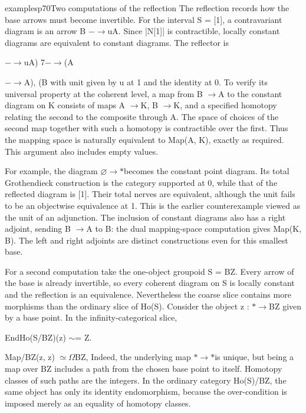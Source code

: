 \begin{dcomment}{examples}{p70}{Two computations of the reflection}
The reflection records how the base arrows must become invertible. For the interval S = [1], a contravariant diagram is an arrow B \ensuremath{-}\ensuremath{\to}uA. Since |N[1]| is contractible, locally constant diagrams are equivalent to constant diagrams. The reflector is

\ensuremath{-}\ensuremath{\to}uA) 7\ensuremath{-}\ensuremath{\to}(A

\ensuremath{-}\ensuremath{\to}A), (B with unit given by u at 1 and the identity at 0. To verify its universal property at the coherent level, a map from B \ensuremath{\to}A to the constant diagram on K consists of maps A \ensuremath{\to}K, B \ensuremath{\to}K, and a specified homotopy relating the second to the composite through A. The space of choices of the second map together with such a homotopy is contractible over the first. Thus the mapping space is naturally equivalent to Map(A, K), exactly as required. This argument also includes empty values.

For example, the diagram \ensuremath{\varnothing}\ensuremath{\to}\ensuremath{*}becomes the constant point diagram. Its total Grothendieck construction is the category supported at 0, while that of the reflected diagram is [1]. Their total nerves are equivalent, although the unit fails to be an objectwise equivalence at 1. This is the earlier counterexample viewed as the unit of an adjunction. The inclusion of constant diagrams also has a right adjoint, sending B \ensuremath{\to}A to B: the dual mapping-space computation gives Map(K, B). The left and right adjoints are distinct constructions even for this smallest base.

For a second computation take the one-object groupoid S = BZ. Every arrow of the base is already invertible, so every coherent diagram on S is locally constant and the reflection is an equivalence. Nevertheless the coarse slice contains more morphisms than the ordinary slice of Ho(S). Consider the object z : \ensuremath{*}\ensuremath{\to}BZ given by a base point. In the infinity-categorical slice,

EndHo(S/BZ)(z) \ensuremath{\sim}= Z.

Map/BZ(z, z) \ensuremath{\simeq}\ensuremath{\Omega}BZ, Indeed, the underlying map \ensuremath{*}\ensuremath{\to}\ensuremath{*}is unique, but being a map over BZ includes a path from the chosen base point to itself. Homotopy classes of such paths are the integers. In the ordinary category Ho(S)/BZ, the same object has only its identity endomorphism, because the over-condition is imposed merely as an equality of homotopy classes.


\end{dcomment}

